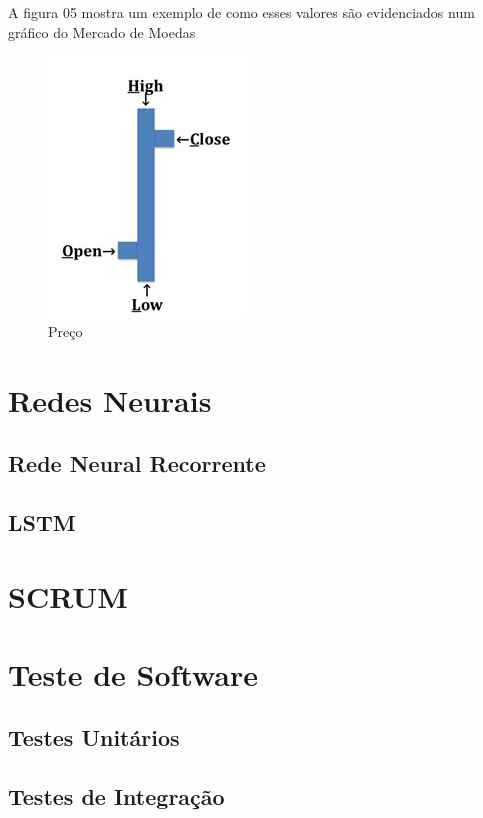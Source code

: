 A figura 05 mostra um exemplo de como esses valores são evidenciados num gráfico do Mercado de Moedas

\begin{figure}[h]
	\centering
	\includegraphics[keepaspectratio=true,scale=1]{figuras/price.png}
	\caption{Preço}
	\label{fig05}
\end{figure}



\section{Redes Neurais}

\subsection{Rede Neural Recorrente}
\subsection{LSTM}

\section{SCRUM}

\section{Teste de Software}
\subsection{Testes Unitários}
\subsection{Testes de Integração}

